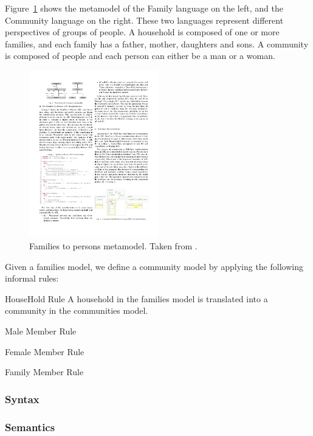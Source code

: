 Figure~\ref{fig:families_to_persons_metamodels} shows the metamodel of the Family language on the left, and the Community language on the right.
These two languages represent different perspectives of groups of people. A household is composed of one or more families, and each family has a father, mother, daughters and sons.
A community is composed of people and each person can either be a man or a woman.

\begin{figure}
\begin{center}
  \includegraphics[width=0.5\textwidth]{figures/families_to_persons_metamodels}
  \caption{Families to persons metamodel. Taken from \cite{Oakes}.}
  \label{fig:families_to_persons_metamodels}
\end{center}
\end{figure}

Given a families model, we define a community model by applying the following informal rules:
\begin{asparadesc}
  \item[HouseHold Rule] A household in the families model is translated into a community in the communities model. 
  \item[Male Member Rule] 
  \item[Female Member Rule]
  \item[Family Member Rule]
\end{asparadesc}

\subsubsection{Syntax}

\subsubsection{Semantics}













